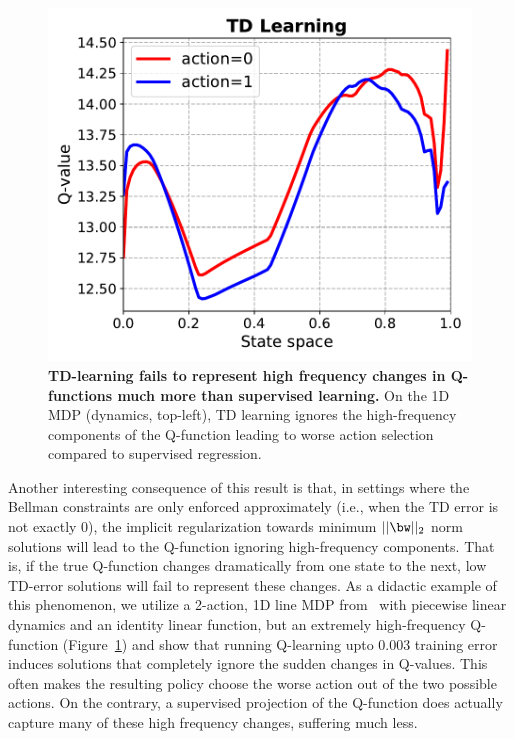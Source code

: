 \begin{figure}
    \includegraphics[width=0.48\linewidth]{section3_figs/td_learning.pdf}
    \vspace{-0.24cm}
    \caption{\small{\textbf{TD-learning fails to represent high frequency changes in Q-functions much more than supervised learning.} On the 1D MDP (dynamics, top-left), TD learning ignores the high-frequency components of the Q-function leading to worse action selection compared to supervised regression.}} 
    \label{fig:1d_mdp}
    \vspace{-0.6cm}
\end{figure}
Another interesting consequence of this result is that, in settings where the Bellman constraints
are only enforced approximately (i.e., when the TD error
is not exactly 0), the implicit regularization towards minimum $||\bw||_2$ norm solutions will lead to the Q-function ignoring high-frequency components. That is, if the true Q-function changes dramatically from one state to the next, low TD-error solutions will fail to represent these changes.
As a didactic example of this phenomenon, we utilize a 2-action, 1D line MDP from~\citep{dong2020expressivity} with piecewise linear dynamics and an identity linear function, but an extremely high-frequency Q-function (Figure~\ref{fig:1d_mdp}) and show that running Q-learning upto 0.003 training error induces solutions that completely ignore the sudden changes in Q-values. This often makes the resulting policy choose the worse action out of the two possible actions. On the contrary, a supervised projection of the Q-function does actually capture many of these high frequency changes, suffering much less.

